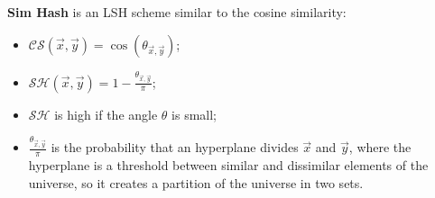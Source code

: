 \ex \textbf{Sim Hash} is an LSH scheme similar to the cosine similarity:
\begin{itemize}
	\item $\mathcal{CS}(\vec{x},\vec{y})=
		\cos(\theta_{\vec{x},\vec{y}}) $;
	\item $\mathcal{SH}(\vec{x},\vec{y})=
		1-\frac{\theta_{\vec{x},\vec{y}}}{\pi} $;
	\item $\mathcal{SH}$ is high if the angle $\theta$ is small;
	\item $\frac{\theta_{\vec{x},\vec{y}}}{\pi}$ is the probability that an hyperplane divides $\vec{x}$ and $\vec{y}$, where the hyperplane is a threshold between similar and dissimilar elements of the universe, so it creates a partition of the universe in two sets.
\end{itemize}




